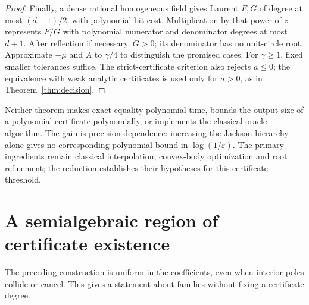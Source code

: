 \documentclass[11pt,a4paper]{article}
\theoremstyle{remark}\newtheorem{remark}[theorem]{Remark}
\begin{document}
\begin{proof}
Finally, a dense rational homogeneous field gives Laurent
\(F,G\) of degree at most \((d+1)/2\), with polynomial bit cost.
Multiplication by that power of \(z\) represents \(F/G\) with
polynomial numerator and denominator degrees at most \(d+1\).
After reflection if necessary, \(G>0\); its denominator has
no unit-circle root. Approximate \(-\mu\) and \(A\) to
\(\gamma/4\) to distinguish the promised cases. For
\(\gamma\geq1\), fixed smaller tolerances suffice.
The strict-certificate criterion also rejects \(a\leq0\);
the equivalence with weak analytic certificates is used only
for \(a>0\), as in Theorem~\ref{thm:decision}.
\end{proof}

Neither theorem makes exact equality polynomial-time, bounds the
output size of a polynomial certificate polynomially, or implements
the classical oracle algorithm. The gain is precision dependence:
increasing the Jackson hierarchy alone gives no corresponding
polynomial bound in \(\log(1/\varepsilon)\).
The primary ingredients remain classical interpolation,
convex-body optimization and root refinement; the reduction
establishes their hypotheses for this certificate threshold.

\section{A semialgebraic region of certificate existence}
The preceding construction is uniform in the coefficients, even when
interior poles collide or cancel. This gives a statement about families
without fixing a certificate degree.
\end{document}

